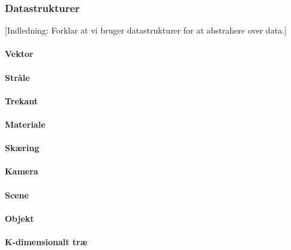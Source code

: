 \subsubsection{Datastrukturer}
[Indledning: Forklar at vi bruger datastrukturer for at abstrahere over data.]
\paragraph{Vektor}
\paragraph{Stråle}
\paragraph{Trekant}
\paragraph{Materiale}
\paragraph{Skæring}
\paragraph{Kamera}
\paragraph{Scene}
\paragraph{Objekt}
\paragraph{K-dimensionalt træ}